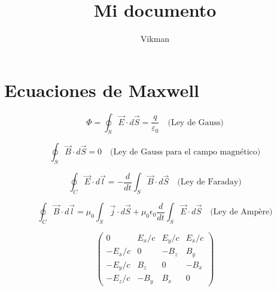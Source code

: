 \documentclass[10pt,a4paper]{article}
\author{Vikman}
\title{Mi documento}
\begin{document}
\section{Ecuaciones de Maxwell}

\begin{equation}
\Phi=\oint_{S}\overrightarrow{E} \cdot d\overrightarrow{S}=\frac{q}{\varepsilon_0} \quad \text{(Ley de Gauss)}
\end{equation}

\begin{equation}
\oint_S\overrightarrow{B} \cdot d\overrightarrow{S}=0 \quad\text{(Ley de Gauss para el campo magnético)}
\end{equation}

\begin{equation}
\oint_C \overrightarrow{E} \cdot d\overrightarrow{l} = - \frac{d}{dt} \int_S \overrightarrow{B} \cdot d\overrightarrow{S} \quad \text{(Ley de Faraday)}
\end{equation}

\begin{equation}
\oint_C \overrightarrow{B} \cdot d\overrightarrow{l}=\mu_0 \int_S \overrightarrow{j} \cdot d\overrightarrow{S} + \mu_0 \epsilon_0 \frac{d}{dt} \int_S \overrightarrow{E} \cdot d\overrightarrow{S} \quad \text{(Ley de Ampère)}
\end{equation}

\begin{equation}
\begin{pmatrix}
0 & E_x/c & E_y/c & E_x/c \\
-E_x/c & 0 & -B_z & B_y \\
-E_y/c & B_z & 0 & -B_x \\
-E_z/c & -B_y & B_x & 0
\end{pmatrix}
\end{equation}
\end{document}
